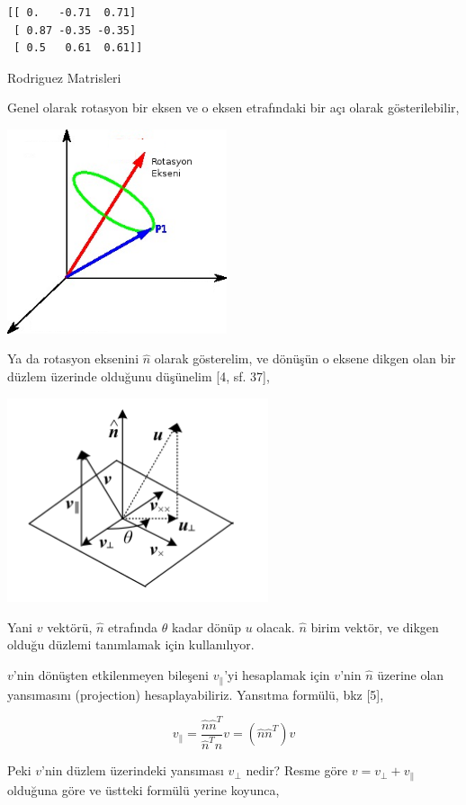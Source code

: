 \documentclass[12pt,fleqn]{article}\usepackage{../../common}
\begin{document}
\begin{verbatim}
[[ 0.   -0.71  0.71]
 [ 0.87 -0.35 -0.35]
 [ 0.5   0.61  0.61]]
\end{verbatim}

Rodriguez Matrisleri

Genel olarak rotasyon bir eksen ve o eksen etrafındaki bir açı olarak
gösterilebilir,

\includegraphics[height=6cm]{phy_072_rot_08.png}

Ya da rotasyon eksenini $\hat{n}$ olarak gösterelim, ve dönüşün o eksene
dikgen olan bir düzlem üzerinde olduğunu düşünelim [4, sf. 37],

\includegraphics[height=6cm]{phy_072_rot_07.png}

Yani $v$ vektörü, $\hat{n}$ etrafında $\theta$ kadar dönüp $u$ olacak. $\hat{n}$ birim vektör, 
ve dikgen olduğu düzlemi tanımlamak için kullanılıyor.

$v$'nin dönüşten etkilenmeyen bileşeni $v_\parallel$'yi hesaplamak için
$v$'nin $\hat{n}$ üzerine olan yansımasını (projection) hesaplayabiliriz. 
Yansıtma formülü, bkz [5],

$$ v_\parallel =  \frac{\hat{n}\hat{n}^T}{\hat{n}^T\hat{n}} v 
= (\hat{n}\hat{n}^T) v
$$

Peki $v$'nin düzlem üzerindeki yansıması $v_\perp$ nedir? Resme göre $v =
v_\perp + v_\parallel$ olduğuna göre ve üstteki formülü yerine koyunca,
\end{document}
